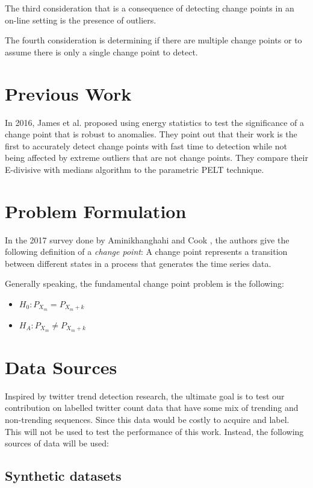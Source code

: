 The third consideration that is a consequence of detecting change points in an on-line setting is the presence of outliers. 

The fourth consideration is determining if there are multiple change points or to assume there is only a single change point to detect. 

\section{Previous Work}


In 2016, James et al. \cite{james2016leveraging} proposed using energy statistics to test the significance of a change point that is robust to anomalies. They point out that their work is the first to accurately detect change points with fast time to detection while not being affected by extreme outliers that are not change points. They compare their E-divisive with medians algorithm to the parametric PELT technique. 

\section{Problem Formulation}
In the 2017 survey done by Aminikhanghahi and Cook \cite{aminikhanghahi2017survey}, the authors give the following definition of a \textit{change point}:
A change point represents a transition between different states in a process that generates the time series data.

Generally speaking, the fundamental change point problem is the following:
\begin{itemize}
  \item $H_0: P_{X_m }=  P_{X_m+k} $
  \item $H_A: P_{X_m} \neq  P_{X_m+k} $
\end{itemize}

\section{Data Sources}

Inspired by twitter trend detection research, the ultimate goal is to test our contribution on labelled twitter count data that have some mix of trending and non-trending sequences. Since this data would be costly to acquire and label. This will not be used to test the performance of this work. Instead, the following sources of data will be used:
 \subsection{Synthetic datasets}
